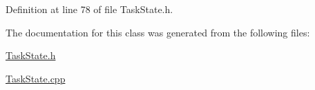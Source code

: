 Definition at line 78 of file Task\+State.\+h.



The documentation for this class was generated from the following files\+:\begin{DoxyCompactItemize}
\item 
\hyperlink{TaskState_8h}{Task\+State.\+h}\item 
\hyperlink{TaskState_8cpp}{Task\+State.\+cpp}\end{DoxyCompactItemize}
